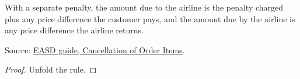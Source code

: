 \begin{theorem}
  \label{thm:change-cancellation-separate-added}
  With a separate penalty, the amount due to the airline is the penalty
  charged plus any price difference the customer pays, and the amount due by
  the airline is any price difference the airline returns.

  Source: \href{https://standards.atlassian.net/wiki/spaces/EASD/pages/574783569/Cancellation+of+Order+Items}{EASD guide, Cancellation of Order Items}.
\end{theorem}
\begin{proof}
  Unfold the rule.
\end{proof}

